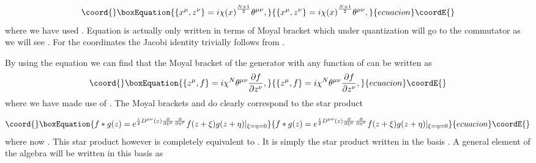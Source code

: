 \documentclass[a4paper,12pt]{article}
\begin{document}
\begin{equation}\coord{}\boxEquation{
\{x^{\mu},z^{\nu}\}=i{{\chi}(x)}^{\frac{N+1}{2}}{\theta}^{{\mu}{\nu}},
}{
\{x^{\mu},z^{\nu}\}=i{{\chi}(x)}^{\frac{N+1}{2}}{\theta}^{{\mu}{\nu}},
}{ecuacion}\coordE{}\end{equation}
where we have used \coordHE{} . Equation \coordHE{} is actually
\coordHE{} only written in terms of Moyal bracket which under
quantization will go to the commutator
 as we will see . For the coordinates \coordHE{} the Jacobi identity \coordHE{} trivially follows from \coordHE{} .

By using the equation \coordHE{} we can find that the Moyal bracket
of the generator \coordHE{} with any function \coordHE{} of \coordHE{}
can be written as
\begin{equation}\coord{}\boxEquation{
\{z^{\mu},f\}=i{\chi}^N{\theta}^{{\mu}{\nu}}\frac{\partial{f}}{\partial{z^{\nu}}},
}{
\{z^{\mu},f\}=i{\chi}^N{\theta}^{{\mu}{\nu}}\frac{\partial{f}}{\partial{z^{\nu}}},
}{ecuacion}\coordE{}\end{equation}
where we have made use of \coordHE{} . The Moyal brackets \coordHE{}
and \coordHE{} do clearly correspond to the star product

\begin{equation}\coord{}\boxEquation{
f*g(z)=e^{\frac{i}{2}{D}^{{\mu}{\nu}}(z)\frac{\partial}{\partial{\xi}^{\mu}}\frac{\partial}{\partial{\eta}^{\nu}}}f(z+{\xi})g(z+{\eta})|_{{\xi}={\eta}=0}
}{
f*g(z)=e^{\frac{i}{2}{D}^{{\mu}{\nu}}(z)\frac{\partial}{\partial{\xi}^{\mu}}\frac{\partial}{\partial{\eta}^{\nu}}}f(z+{\xi})g(z+{\eta})|_{{\xi}={\eta}=0}
}{ecuacion}\coordE{}\end{equation}
where now  \coordHE{} . This star product however is
completely equivalent to \coordHE{} . It is simply the star product
\coordHE{} written in the basis \coordHE{}  . A general element of
the algebra \coordHE{} will be written in this basis as
\end{document}
